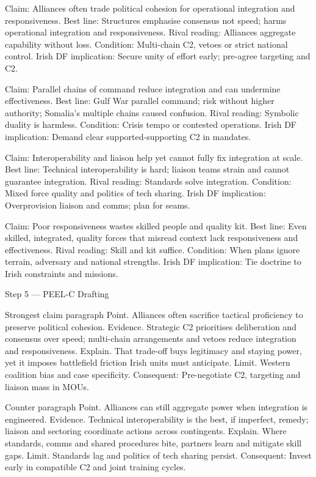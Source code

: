 Claim: Alliances often trade political cohesion for operational integration and responsiveness.
Best line: Structures emphasise consensus not speed; harms operational integration and responsiveness.
Rival reading: Alliances aggregate capability without loss.
Condition: Multi-chain C2, vetoes or strict national control.
Irish DF implication: Secure unity of effort early; pre-agree targeting and C2.

Claim: Parallel chains of command reduce integration and can undermine effectiveness.
Best line: Gulf War parallel command; risk without higher authority; Somalia’s multiple chains caused confusion.
Rival reading: Symbolic duality is harmless.
Condition: Crisis tempo or contested operations.
Irish DF implication: Demand clear supported-supporting C2 in mandates.

Claim: Interoperability and liaison help yet cannot fully fix integration at scale.
Best line: Technical interoperability is hard; liaison teams strain and cannot guarantee integration.
Rival reading: Standards solve integration.
Condition: Mixed force quality and politics of tech sharing.
Irish DF implication: Overprovision liaison and comms; plan for seams.

Claim: Poor responsiveness wastes skilled people and quality kit.
Best line: Even skilled, integrated, quality forces that misread context lack responsiveness and effectiveness.
Rival reading: Skill and kit suffice.
Condition: When plans ignore terrain, adversary and national strengths.
Irish DF implication: Tie doctrine to Irish constraints and missions.

Step 5 — PEEL-C Drafting

Strongest claim paragraph
Point. Alliances often sacrifice tactical proficiency to preserve political cohesion.
Evidence. Strategic C2 prioritises deliberation and consensus over speed; multi-chain arrangements and vetoes reduce integration and responsiveness.
Explain. That trade-off buys legitimacy and staying power, yet it imposes battlefield friction Irish units must anticipate.
Limit. Western coalition bias and case specificity. Consequent: Pre-negotiate C2, targeting and liaison mass in MOUs.

Counter paragraph
Point. Alliances can still aggregate power when integration is engineered.
Evidence. Technical interoperability is the best, if imperfect, remedy; liaison and sectoring coordinate actions across contingents.
Explain. Where standards, comms and shared procedures bite, partners learn and mitigate skill gaps.
Limit. Standards lag and politics of tech sharing persist. Consequent: Invest early in compatible C2 and joint training cycles.

